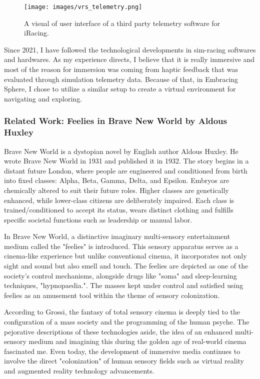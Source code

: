                 \begin{figure}[H]
                    \centering
                    \texttt{[image: images/vrs\_telemetry.png]}
                    \caption{A visual of user interface of a third party telemetry software for iRacing.}
                    \label{fig:VRS}
                \end{figure}

                Since 2021, I have followed the technological developments in sim-racing softwares and hardwares. As my experience directs, I believe that it is really immersive and most of the reason for immersion was coming from haptic feedback that was evaluated through simulation telemetry data. Because of that, in Embracing Sphere, I chose to utilize a similar setup to create a virtual environment for navigating and exploring.\par
            \subsubsection{Related Work: Feelies in Brave New World by Aldous Huxley}    
                Brave New World is a dystopian novel by English author Aldous Huxley. He wrote Brave New World in 1931 and published it in 1932\cite{Brave_New_World}. The story begins in a distant future London, where people are engineered and conditioned from birth into fixed classes: Alpha, Beta, Gamma, Delta, and Epsilon. Embryos are chemically altered to suit their future roles. Higher classes are genetically enhanced, while lower-class citizens are deliberately impaired. Each class is trained/conditioned to accept its status, wears distinct clothing and fulfills specific societal functions such as leadership or manual labor.\par

                In Brave New World, a distinctive imaginary multi-sensory entertainment medium called the "feelies" is introduced. This sensory apparatus serves as a cinema-like experience but unlike conventional cinema, it incorporates not only sight and sound but also smell and touch. The feelies are depicted as one of the society's control mechanisms, alongside drugs like "soma" and sleep-learning techniques, "hypnopaedia."\cite{Pleasure_of_Modernism}. The masses kept under control and satisfied using feelies as an amusement tool within the theme of sensory colonization\cite{Feelies}.\par

                According to Grossi\cite{Feelies}, the fantasy of total sensory cinema is deeply tied to the configuration of a mass society and the programming of the human psyche. The pejorative descriptions of these technologies aside, the idea of an enhanced multi-sensory medium and imagining this during the golden age of real-world cinema fascinated me. Even today, the development of immersive media continues to involve the direct "colonization" of human sensory fields such as virtual reality and augmented reality technology advancements.\par

